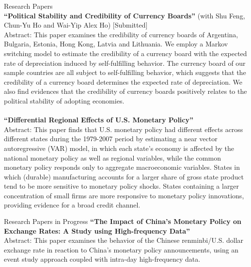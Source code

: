 \documentclass{resume_liang} %
\begin{document}
\begin{rSection}{Research Papers}
\\
\textbf{``Political Stability and Credibility of Currency Boards''} (with Shu Feng, Chun-Yu Ho and Wai-Yip Alex Ho) [Submitted] \\
Abstract: This paper examines the credibility of currency boards of Argentina, Bulgaria, Estonia, Hong Kong, Latvia and Lithuania. We employ a Markov switching model to estimate the credibility of a currency board with the expected rate of depreciation induced by self-fulfilling behavior. The currency board of our sample countries are all subject to self-fulfilling behavior, which suggests that the credibility of a currency board determines the expected rate of depreciation. We also find evidences that the credibility of currency boards positively relates to the political stability of adopting economies.
\\
\\
\textbf{``Differential Regional Effects of U.S. Monetary Policy''} \\
Abstract: This paper finds that U.S. monetary policy had different effects across different states during the 1979-2007 period by estimating a near vector autoregressive (VAR) model, in which each state's economy is affected by the national monetary policy as well as regional variables, while the common monetary policy responds only to aggregate macroeconomic variables. States in which (durable) manufacturing accounts for a larger share of gross state product tend to be more sensitive to monetary policy shocks. States containing a larger concentration of small firms are more responsive to
monetary policy innovations, providing evidence for a broad credit channel.
\\

\end{rSection}
\bigskip \bigskip




\begin{rSection}{Research Papers in Progress}
\textbf{``The Impact of China's Monetary Policy on Exchange Rates: A Study using High-frequency Data''}\\
Abstract: This paper examines the behavior of the Chinese renminbi/U.S. dollar exchange rate in reaction to China's monetary policy announcements, using an event study approach coupled with intra-day high-frequency data.

\end{rSection}
\bigskip \bigskip
\end{document}
